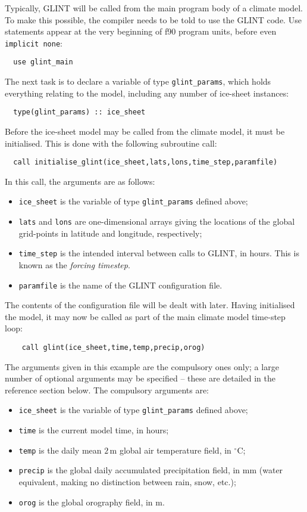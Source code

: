 Typically, GLINT will be called from the main program body of a
climate model. To make this possible, the compiler needs to be told to use the
GLINT code. Use statements appear at the very beginning of f90 program
units, before even \texttt{implicit none}:
%
\begin{verbatim}
  use glint_main
\end{verbatim}
%
The next task is to declare a variable of type \texttt{glint\_params}, which
holds everything relating to the model, including any number of ice-sheet
instances:
%
\begin{verbatim}
  type(glint_params) :: ice_sheet
\end{verbatim}
%
Before the ice-sheet model may be called from the climate model, it must be
initialised. This is done with the following subroutine call:
%
\begin{verbatim}
  call initialise_glint(ice_sheet,lats,lons,time_step,paramfile)
\end{verbatim}
%
In this call, the arguments are as follows:
%
\begin{itemize}
\item \texttt{ice\_sheet} is the variable of type \texttt{glint\_params}
 defined above;
\item \texttt{lats} and \texttt{lons} are one-dimensional arrays giving the
  locations of the global grid-points in latitude and longitude, respectively;
\item \texttt{time\_step} is the intended interval between calls to GLINT, in
hours. This is known as the \emph{forcing timestep}. 
\item \texttt{paramfile} is the name of the GLINT configuration file.
\end{itemize}
%
The contents of the configuration file will be dealt with later. Having
initialised the model, it may now be called as part of the main climate
model time-step loop:
%
\begin{verbatim}
    call glint(ice_sheet,time,temp,precip,orog)
\end{verbatim} 
%
The arguments given in this example are the compulsory ones only; a large number of
optional arguments may be specified -- these are detailed in the reference
section below. The compulsory arguments are:
%
\begin{itemize}
\item \texttt{ice\_sheet} is the variable of type \texttt{glint\_params}
 defined above;
\item \texttt{time} is the current model time, in hours;
\item \texttt{temp} is the daily mean $2\,\mathrm{m}$ global air temperature field, in
  $^{\circ}\mathrm{C}$;
\item \texttt{precip} is the global daily accumulated precipitation field,
  in $\mathrm{mm}$ (water equivalent, making no distinction
  between rain, snow, etc.);
\item \texttt{orog} is the global orography field, in $\mathrm{m}$.
\end{itemize}
